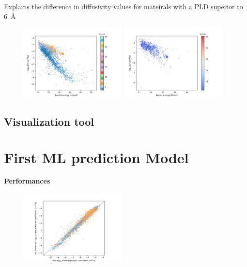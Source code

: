\documentclass[main]{subfiles}
\begin{document}
Explains the difference in diffusivity values for mateirals with a PLD superior to \SI{6}{\angstrom}
\begin{figure}[ht]
  \centering
    \includegraphics[width=0.48\textwidth]{figures/5-diffusion/difflog_barrier_Df_uff.pdf}
    \includegraphics[width=0.48\textwidth]{figures/5-diffusion/difflog_barrier_Df_uff_2.pdf}
    \caption{}\label{fgr:barrier_diffusion}
\end{figure}

\subsection{Visualization tool}


\section{First ML prediction Model}



\textbf{Performances}

\begin{figure}[ht]
  \centering
    \includegraphics[width=0.48\textwidth]{figures/5-diffusion/diffusion_prediction.pdf}
    \caption{}\label{fgr:diffusion_pred}
\end{figure}
\end{document}
